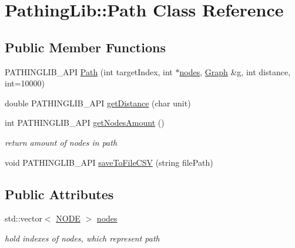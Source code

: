\hypertarget{class_pathing_lib_1_1_path}{}\section{Pathing\+Lib\+:\+:Path Class Reference}
\label{class_pathing_lib_1_1_path}
\subsection*{Public Member Functions}
\begin{DoxyCompactItemize}
\item 
P\+A\+T\+H\+I\+N\+G\+L\+I\+B\+\_\+\+A\+PI \hyperlink{class_pathing_lib_1_1_path_a6f2924c9de3918d8f9e0775d63d10b10}{Path} (int target\+Index, int $\ast$\hyperlink{class_pathing_lib_1_1_path_a91bb2272395c85abb89dc26e1f3811bd}{nodes}, \hyperlink{class_pathing_lib_1_1_graph}{Graph} \&g, int distance, int=10000)
\item 
double P\+A\+T\+H\+I\+N\+G\+L\+I\+B\+\_\+\+A\+PI \hyperlink{class_pathing_lib_1_1_path_a69c49b0fc70684d367d7dc8dd2de700e}{get\+Distance} (char unit)
\item 
int P\+A\+T\+H\+I\+N\+G\+L\+I\+B\+\_\+\+A\+PI \hyperlink{class_pathing_lib_1_1_path_ad15ebba8d458ccc64c350dad7e06fbf2}{get\+Nodes\+Amount} ()\hypertarget{class_pathing_lib_1_1_path_ad15ebba8d458ccc64c350dad7e06fbf2}{}\label{class_pathing_lib_1_1_path_ad15ebba8d458ccc64c350dad7e06fbf2}

\begin{DoxyCompactList}\small\item\em return amount of nodes in path \end{DoxyCompactList}\item 
void P\+A\+T\+H\+I\+N\+G\+L\+I\+B\+\_\+\+A\+PI \hyperlink{class_pathing_lib_1_1_path_af9ed758ac4a395b4ab7a2b025e785e96}{save\+To\+File\+C\+SV} (string file\+Path)
\end{DoxyCompactItemize}
\subsection*{Public Attributes}
\begin{DoxyCompactItemize}
\item 
std\+::vector$<$ \hyperlink{class_pathing_lib_1_1_n_o_d_e}{N\+O\+DE} $>$ \hyperlink{class_pathing_lib_1_1_path_a91bb2272395c85abb89dc26e1f3811bd}{nodes}\hypertarget{class_pathing_lib_1_1_path_a91bb2272395c85abb89dc26e1f3811bd}{}\label{class_pathing_lib_1_1_path_a91bb2272395c85abb89dc26e1f3811bd}

\begin{DoxyCompactList}\small\item\em hold indexes of nodes, which represent path \end{DoxyCompactList}\end{DoxyCompactItemize}



